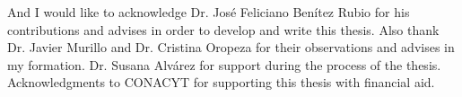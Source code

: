 
\begin{acknowledgements}      
And I would like to acknowledge Dr. Jos\'e Feliciano Ben\'itez Rubio for his contributions and advises in order to develop  and write this thesis. Also thank Dr. Javier Murillo and  Dr. Cristina Oropeza for their observations and advises in my formation. 
Dr. Susana Alv\'arez for support during the process of the thesis. Acknowledgments to CONACYT for supporting this thesis with financial aid. 
\end{acknowledgements}
